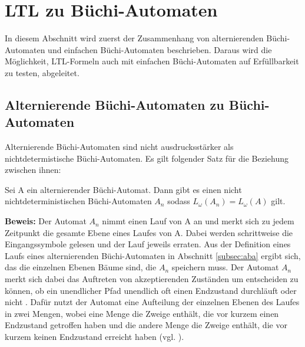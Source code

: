 \section{LTL zu Büchi-Automaten}

In diesem Abschnitt wird zuerst der Zusammenhang von alternierenden Büchi-Automaten und einfachen Büchi-Automaten beschrieben. Daraus wird die Möglichkeit, LTL-Formeln auch mit einfachen Büchi-Automaten auf Erfüllbarkeit zu testen, abgeleitet.

\subsection{Alternierende Büchi-Automaten zu Büchi-Automaten}

Alternierende Büchi-Automaten sind nicht ausdrucksstärker als nichtdetermistische Büchi-Automaten. Es gilt folgender Satz für die Beziehung zwischen ihnen:
\begin{satz}\cite{vardi+96,miyano+84}
\label{ABA>BA}
Sei A ein alternierender Büchi-Automat. Dann gibt es einen nicht nichtdeterministischen Büchi-Automaten $A_n$ sodass $L_{\omega}(A_n)=L_{\omega}(A)$ gilt.
\end{satz}
\textbf{Beweis:} Der Automat $A_n$ nimmt einen Lauf von A an und merkt sich zu jedem Zeitpunkt die gesamte Ebene eines Laufes von A. Dabei werden schrittweise die Eingangssymbole gelesen und der Lauf jeweils erraten. Aus der Definition eines Laufs eines alternierenden Büchi-Automaten in Abschnitt \ref{subsec:aba} ergibt sich, das die einzelnen Ebenen Bäume sind, die $A_n$ speichern muss. Der Automat $A_n$ merkt sich dabei das Auftreten von akzeptierenden Zuständen um entscheiden zu können, ob ein unendlicher Pfad unendlich oft einen Endzustand durchläuft oder nicht \cite{vardi+96}. Dafür nutzt der Automat eine Aufteilung der einzelnen Ebenen des Laufes in zwei Mengen, wobei eine Menge die Zweige enthält, die vor kurzem einen Endzustand getroffen haben und die andere Menge die Zweige enthält, die vor kurzem keinen Endzustand erreicht haben (vgl. \cite{vardi+96}).

